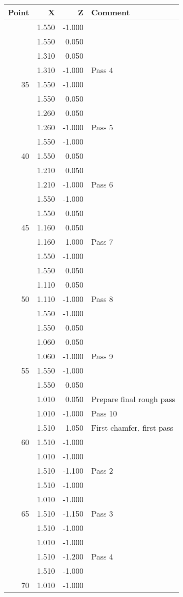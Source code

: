 \documentclass{article}
\begin{document}
\newpage

\begin{figure}[H]
\begin{tabular}{rrrl} \toprule
	Point & X & Z & Comment \\
	\midrule
	& 1.550 & -1.000 & \\
	& 1.550 & 0.050 & \\
	& 1.310 & 0.050 & \\
	& 1.310 & -1.000 & Pass 4 \\
	35 & 1.550 & -1.000 & \\
	& 1.550 & 0.050 & \\
	& 1.260 & 0.050 & \\
	& 1.260 & -1.000 & Pass 5 \\
	& 1.550 & -1.000 & \\
	40 & 1.550 & 0.050 & \\
	& 1.210 & 0.050 & \\
	& 1.210 & -1.000 & Pass 6 \\
	& 1.550 & -1.000 & \\
	& 1.550 & 0.050 & \\
	45 & 1.160 & 0.050 & \\
	& 1.160 & -1.000 & Pass 7 \\
	& 1.550 & -1.000 & \\
	& 1.550 & 0.050 & \\
	& 1.110 & 0.050 & \\
	50 & 1.110 & -1.000 & Pass 8 \\
	& 1.550 & -1.000 & \\
	& 1.550 & 0.050 & \\
	& 1.060 & 0.050 & \\
	& 1.060 & -1.000 & Pass 9 \\
	55 & 1.550 & -1.000 & \\
	& 1.550 & 0.050 & \\
	& 1.010 & 0.050 & Prepare final rough pass \\
	& 1.010 & -1.000 & Pass 10 \\
	& 1.510 & -1.050 & First chamfer, first pass \\
	60 & 1.510 & -1.000 & \\
	& 1.010 & -1.000 & \\
	& 1.510 & -1.100 & Pass 2 \\
	& 1.510 & -1.000 & \\
	& 1.010 & -1.000 & \\
	65 & 1.510 & -1.150 & Pass 3 \\
	& 1.510 & -1.000 & \\
	& 1.010 & -1.000 & \\
	& 1.510 & -1.200 & Pass 4 \\
	& 1.510 & -1.000 & \\
	70 & 1.010 & -1.000 & \\
	\bottomrule
\end{tabular}
\end{figure}
\end{document}
